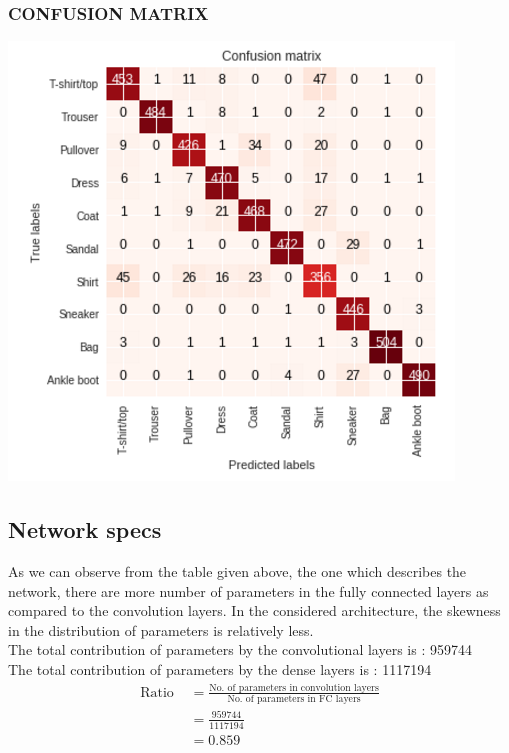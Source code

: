 \documentclass[12pt]{report}
\begin{document}
\subsubsection{CONFUSION MATRIX}
\begin{center}
\includegraphics[scale=0.8]{confusion.png}
\end{center}

\subsection{Network specs}
As we can observe from the table given above, the one which describes the network, there are more number of parameters in the fully connected layers as compared to the convolution layers. In the considered architecture, the skewness in the distribution of parameters is relatively less. \\
The total contribution of parameters by the convolutional layers is : 959744\\
The total contribution of parameters by the dense layers is : 1117194
\begin{align*}
\textrm{Ratio } & = \frac{\textrm{No. of parameters in convolution layers}}{\textrm{No. of parameters in FC layers}}\\
				& = \frac{959744}{1117194} \\
                & = 0.859
\end{align*}
\end{document}
